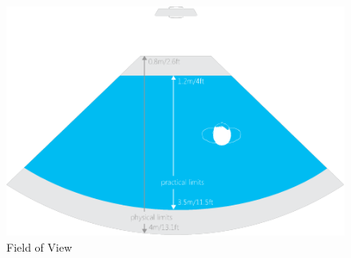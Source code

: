 \begin{figure}
\begin{center}
\includegraphics[scale=0.8]{graphics/view_field.png}
\caption{Field of View}
\label{Field of View}
\end{center}
\end{figure}
